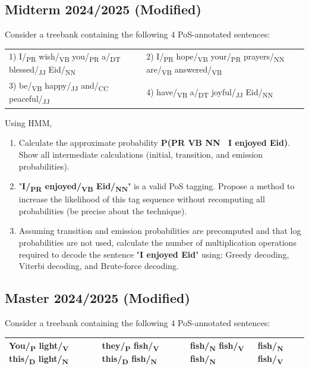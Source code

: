 \documentclass{../extra/aakpract/aakpract}
\begin{document}
	\subsection{Midterm 2024/2025 (Modified)}
	
	Consider a treebank containing the following 4 PoS-annotated sentences:
	\begin{center}
		\begin{tabular}{|ll|}
			\hline
			1) I/\textsubscript{PR} wish/\textsubscript{VB} you/\textsubscript{PR} a/\textsubscript{DT} blessed/\textsubscript{JJ} Eid/\textsubscript{NN} &
			2) I/\textsubscript{PR} hope/\textsubscript{VB} your/\textsubscript{PR} prayers/\textsubscript{NN} are/\textsubscript{VB} answered/\textsubscript{VB} \\
			3) be/\textsubscript{VB} happy/\textsubscript{JJ} and/\textsubscript{CC} peaceful/\textsubscript{JJ} &
			4) have/\textsubscript{VB} a/\textsubscript{DT} joyful/\textsubscript{JJ} Eid/\textsubscript{NN} \\
			\hline
		\end{tabular}
	\end{center}
	
	Using HMM,
	\begin{enumerate}
		\item Calculate the approximate probability \textbf{P(PR VB NN  \textbar\ I enjoyed Eid)}. 
		Show all intermediate calculations (initial, transition, and emission probabilities).
		\item "\textbf{I/\textsubscript{PR} enjoyed/\textsubscript{VB} Eid/\textsubscript{NN}}" is a valid PoS tagging. 
		Propose a method to increase the likelihood of this tag sequence without recomputing all probabilities (be precise about the technique).
		\item Assuming transition and emission probabilities are precomputed and that log probabilities are not used, calculate the number of multiplication operations required to decode the sentence "\textbf{I enjoyed Eid}" using: Greedy decoding, Viterbi decoding, and Brute-force decoding.
	\end{enumerate}
	
	
	\subsection{Master 2024/2025 (Modified)}
	
	Consider a treebank containing the following 4 PoS-annotated sentences:
	\begin{center}
		\begin{tabular}{|l|l|l|l|}
			\hline
			You/\textsubscript{P} light/\textsubscript{V} this/\textsubscript{D} light/\textsubscript{N} &
			they/\textsubscript{P} fish/\textsubscript{V} this/\textsubscript{D} fish/\textsubscript{N} &
			fish/\textsubscript{N} fish/\textsubscript{V} fish/\textsubscript{N} &
			fish/\textsubscript{N} fish/\textsubscript{V} \\
			\hline
		\end{tabular}
	\end{center}
	
\end{document}
